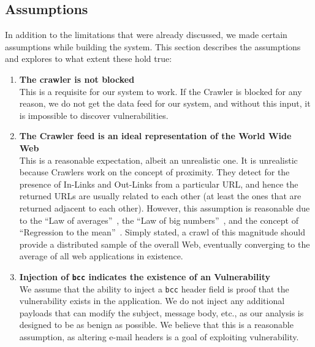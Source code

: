 \subsection{Assumptions}
In addition to the limitations that were already discussed, we made certain assumptions while building the system. This section describes the assumptions and explores to what extent these hold true:
\begin{enumerate}
	\item \textbf{The crawler is not blocked}\\
	This is a requisite for our system to work. If the Crawler is blocked for any reason, we do not get the data feed for our system, and without this input, it is impossible to discover vulnerabilities. 
	
	\item \textbf{The Crawler feed is an ideal representation of the World Wide Web} \\
	This is a reasonable expectation, albeit an unrealistic one.
It is unrealistic because Crawlers work on the concept of proximity. They detect for the presence of In-Links and Out-Links from a particular URL, and hence the returned URLs are usually related to each other (at least the ones that are returned adjacent to each other).	However, this assumption is reasonable due to the ``Law of averages''~\cite{wiki:Law_of_averages}, the ``Law of big numbers''~\cite{wiki:Law_of_large_numbers}, and the concept of ``Regression to the mean''~\cite{wiki:Regression_toward_the_mean}. Simply stated, a crawl of this magnitude should provide a distributed sample of the overall Web, eventually converging to the average of all web applications in existence.
	
	\item \textbf{Injection of \texttt{bcc} indicates the existence of an \ehi Vulnerability} \\
	We assume that the ability to inject a \texttt{bcc} header field is proof that the \ehi vulnerability exists in the application. We do not inject any additional payloads that can modify the subject, message body, etc., as our analysis is designed to be as benign as possible.
	We believe that this is a reasonable assumption, as altering e-mail headers is a goal of exploiting \ehi vulnerability.
\end{enumerate}
